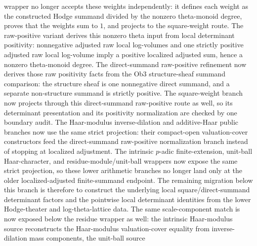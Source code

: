 \begin{proposition}
	  wrapper
	  no longer accepts these weights independently: it defines each weight as
	  the constructed Hodge summand divided by the nonzero theta-monoid degree,
	  proves that the weights sum to \(1\), and projects to the square-weight
	  route.  The raw-positive variant derives this nonzero theta input from
	  local determinant positivity: nonnegative adjusted raw local log-volumes
	  and one strictly positive adjusted raw local log-volume imply a positive
	  localized adjusted sum, hence a nonzero theta-monoid degree.  The
	  direct-summand raw-positive refinement now derives those raw positivity
	  facts from the Ob3 structure-sheaf summand comparison: the structure
	  sheaf is one nonnegative direct summand, and a separate non-structure
	  summand is strictly positive.  The square-weight branch now projects
	  through this direct-summand raw-positive route as well, so its determinant
	  presentation and its positivity normalization are checked by one boundary
	  audit.  The Haar-modulus inverse-dilation and additive-Haar public
	  branches now use the same strict projection: their compact-open
	  valuation-cover constructors feed the direct-summand raw-positive
	  normalization branch instead of stopping at localized adjustment.  The
	  intrinsic \(p\)-adic finite-extension, unit-ball Haar-character, and
	  residue-module/unit-ball wrappers now expose the same strict projection,
	  so these lower arithmetic branches no longer land only at the older
	  localized-adjusted finite-summand endpoint.  The
	  remaining migration below this branch is therefore to
	  construct the underlying local square/direct-summand determinant factors
	  and the pointwise local determinant identities from the lower
	  Hodge-theater and log-theta-lattice data.
	  The same scale-component
	  match is now exposed below the residue wrapper as well: the intrinsic
	  Haar-modulus source
	  reconstructs the Haar-modulus valuation-cover equality from inverse-dilation
	  mass components, the unit-ball source

\end{proposition}
